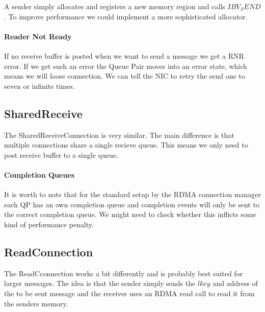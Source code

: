 \documentclass[a4paper,twoside]{article} %
\begin{document}
A sender simply allocates and registers a new memory region and calls $IBV_SEND$. To improve performance we could implement 
a more sophisticated allocator.

\paragraph{Reader Not Ready} If no receive buffer is posted when we want to send a message we get a RNR error. If we get 
such an error the Queue Pair moves into an error state, which means we will loose connection. We can tell the NIC to 
retry the send one to seven or infinite times.

\subsection*{SharedReceive}

The SharedReceiveConnection is very similar. The main difference is that multiple connections share a single recieve queue.
This means we only need to post receive buffer to a single queue.

\paragraph{Completion Queues} It is worth to note that for the standard setup by the RDMA connection manager each QP has 
an own completion queue and completion events will only be sent to the correct completion queue. We might need to check 
whether this inflicts some kind of performance penalty.

\subsection*{ReadConnection}

The ReadCconnection works a bit differently and is probably best suited for larger messages. The idea is that the sender
simply sends the $lkey$ and address of the to be sent message and the receiver uses an RDMA read call to read it from the
senders memory.
\end{document}
